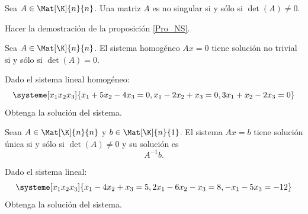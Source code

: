 \documentclass[compacto,10pt]{pubciencias-notas}
\begin{document}
\begin{prop}\label{Pro_NS}
Sea $A\in\Mat[\K]{n}{n}$. Una matriz $A$ es no singular si y sólo si $\det(A)\neq0$.
\end{prop}

\begin{ejer} Hacer la demostración de la proposición \ref{Pro_NS}.
\end{ejer}

\begin{prop}
Sea $A\in\Mat[\K]{n}{n}$. El sistema homogéneo $Ax=0$ tiene solución no trivial si y sólo si $\det(A)=0$.
\end{prop}

\begin{ejer}
Dado el sistema lineal homogéneo:
\[
\systeme[x_1 x_2 x_3]{x_1+5x_2-4x_3=0, x_1-2x_2+x_3=0, 3x_1+x_2-2x_3=0}
\]
Obtenga la solución del sistema.
\end{ejer}
\begin{prop}
Sean $A\in\Mat[\K]{n}{n}$ y $b\in\Mat[\K]{n}{1}$. El sistema $Ax=b$ tiene solución única si y sólo si $\det(A)\neq0$ y su solución es
\[
    A^{- 1}b.
\]
\end{prop}
\begin{ejer}
Dado el sistema lineal:
\[
\systeme[x_1 x_2 x_3]{x_1-4x_2+x_3=5, 2x_1-6x_2-x_3=8, -x_1-5x_3=-12}
\]
Obtenga la solución del sistema.
\end{ejer}
\end{document}
